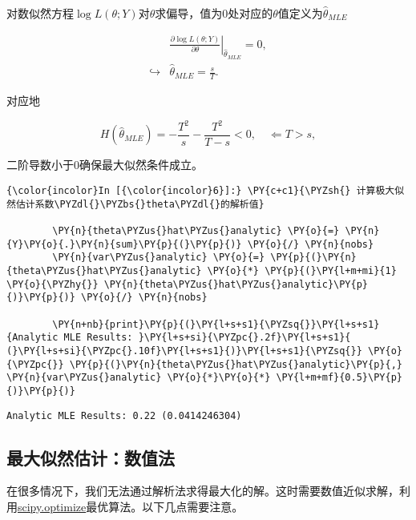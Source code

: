 对数似然方程\(\log L(\theta;Y)\)对\(\theta\)求偏导，值为\(0\)处对应的\(\theta\)值定义为\(\widehat{\theta}_{MLE}\)

\begin{equation}
\begin{split}
& \left. \frac{\partial \log L(\theta; Y)}{\partial \theta} \right|_{\widehat{\theta}_{MLE}} = 0, \\
\hookrightarrow & \widehat{\theta}_{MLE} = \frac{s}{T}.
\end{split}
\end{equation}

对应地

\begin{equation}
H \left( \widehat{\theta}_{MLE}\right) = - \frac{T^{2}}{s} - \frac{T^{2}}{T-s} <0, \quad \Leftarrow T > s,
\end{equation}

二阶导数小于\(0\)确保最大似然条件成立。

    \begin{Verbatim}[commandchars=\\\{\}]
{\color{incolor}In [{\color{incolor}6}]:} \PY{c+c1}{\PYZsh{} 计算极大似然估计系数\PYZdl{}\PYZbs{}theta\PYZdl{}的解析值}

        \PY{n}{theta\PYZus{}hat\PYZus{}analytic} \PY{o}{=} \PY{n}{Y}\PY{o}{.}\PY{n}{sum}\PY{p}{(}\PY{p}{)} \PY{o}{/} \PY{n}{nobs}
        \PY{n}{var\PYZus{}analytic} \PY{o}{=} \PY{p}{(}\PY{n}{theta\PYZus{}hat\PYZus{}analytic} \PY{o}{*} \PY{p}{(}\PY{l+m+mi}{1} \PY{o}{\PYZhy{}} \PY{n}{theta\PYZus{}hat\PYZus{}analytic}\PY{p}{)}\PY{p}{)} \PY{o}{/} \PY{n}{nobs}

        \PY{n+nb}{print}\PY{p}{(}\PY{l+s+s1}{\PYZsq{}}\PY{l+s+s1}{Analytic MLE Results: }\PY{l+s+si}{\PYZpc{}.2f}\PY{l+s+s1}{ (}\PY{l+s+si}{\PYZpc{}.10f}\PY{l+s+s1}{)}\PY{l+s+s1}{\PYZsq{}} \PY{o}{\PYZpc{}} \PY{p}{(}\PY{n}{theta\PYZus{}hat\PYZus{}analytic}\PY{p}{,} \PY{n}{var\PYZus{}analytic} \PY{o}{*}\PY{o}{*} \PY{l+m+mf}{0.5}\PY{p}{)}\PY{p}{)}
\end{Verbatim}

    \begin{Verbatim}[commandchars=\\\{\}]
Analytic MLE Results: 0.22 (0.0414246304)

    \end{Verbatim}

\subsection{最大似然估计：数值法}\label{ux6700ux5927ux4f3cux7136ux4f30ux8ba1ux6570ux503cux6cd5}
在很多情况下，我们无法通过解析法求得最大化的解。这时需要数值近似求解，利用\href{https://docs.scipy.org/doc/scipy/reference/optimize.html}{scipy.optimize}最优算法。以下几点需要注意。

